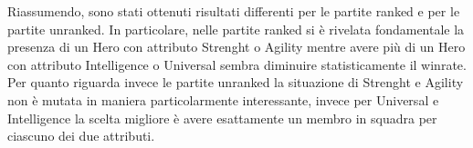 Riassumendo, sono stati ottenuti risultati differenti per le partite ranked e per le partite unranked. In particolare, nelle partite ranked si è rivelata fondamentale la presenza di un Hero con attributo Strenght o Agility mentre avere più di un Hero con attributo Intelligence o Universal sembra diminuire statisticamente il winrate. Per quanto riguarda invece le partite unranked la situazione di Strenght e Agility non è mutata in maniera particolarmente interessante, invece per Universal e Intelligence la scelta migliore è avere esattamente un membro in squadra per ciascuno dei due attributi.